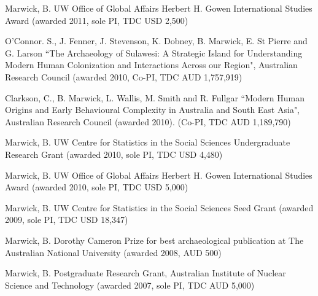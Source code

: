 \ind Marwick, B. UW Office of Global Affairs Herbert H. Gowen International Studies Award (awarded 2011, sole PI, TDC USD 2,500)

\ind O’Connor. S., J. Fenner, J. Stevenson, K. Dobney, B. Marwick, E. St Pierre and G. Larson ``The Archaeology of Sulawesi: A Strategic Island for Understanding Modern Human Colonization and Interactions Across our Region", Australian Research Council (awarded 2010, Co-PI, TDC AUD 1,757,919)

\ind Clarkson, C., B. Marwick, L. Wallis, M. Smith and R. Fullgar  ``Modern Human Origins and Early Behavioural Complexity in Australia and South East Asia", Australian Research Council (awarded 2010). (Co-PI, TDC AUD 1,189,790)

\ind Marwick, B. UW Centre for Statistics in the Social Sciences Undergraduate Research Grant (awarded 2010, sole PI, TDC USD 4,480)

\ind Marwick, B. UW Office of Global Affairs Herbert H. Gowen International Studies Award (awarded 2010, sole  PI, TDC USD 5,000)

\ind Marwick, B. UW Centre for Statistics in the Social Sciences Seed Grant (awarded 2009, sole PI, TDC USD 18,347)

\ind Marwick, B. Dorothy Cameron Prize for best archaeological publication at The Australian National University (awarded 2008, AUD 500)

\ind Marwick, B. Postgraduate Research Grant, Australian Institute of Nuclear Science and Technology (awarded 2007, sole PI, TDC AUD 5,000)
